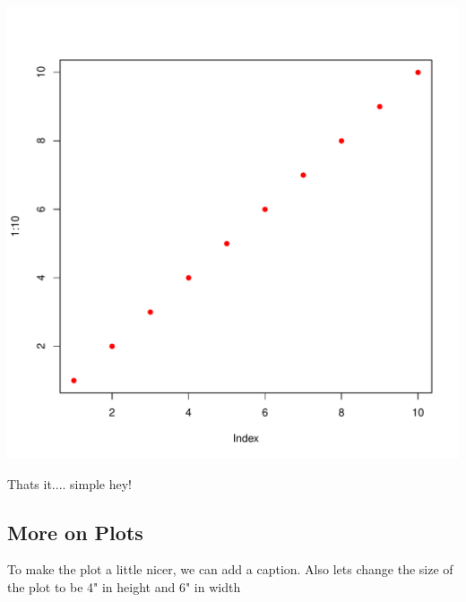 \begin{knitrout}
\color{fgcolor}\begin{kframe}
\begin{alltt}
\hlstd{(}\hlopt{:}\hlstd{,} \hlstd{=}\hlstd{,} \hlstd{=}\hlstd{)}
\end{alltt}
\end{kframe}
\includegraphics[width=\maxwidth]{figure/test2-1} 

\end{knitrout}

Thats it.... simple hey!


\subsection{More on Plots}

To make the plot a little nicer, we can add a caption. Also lets change the size of the plot to be 4" in height and 6" in width

